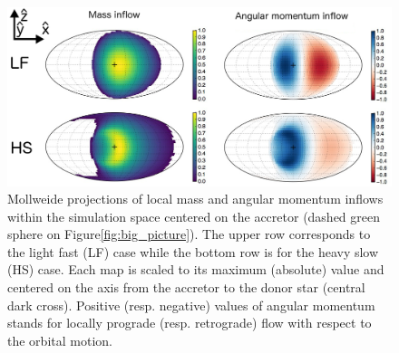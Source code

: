 \documentclass{aa}
\begin{document}
\begin{figure}[!b]
\centering
\includegraphics[width=2\columnwidth]{Pictures/inflow_maps.png}
\caption{Mollweide projections of local mass and angular momentum inflows within the simulation space centered on the accretor (dashed green sphere on Figure\ref{fig:big_picture}). The upper row corresponds to the light fast (LF) case while the bottom row is for the heavy slow (HS) case. Each map is scaled to its maximum (absolute) value and centered on the axis from the accretor to the donor star (central dark cross). Positive (resp. negative) values of angular momentum stands for locally prograde (resp. retrograde) flow with respect to the orbital motion.}
\label{fig:inflow_maps}
\end{figure} 
\end{document}
